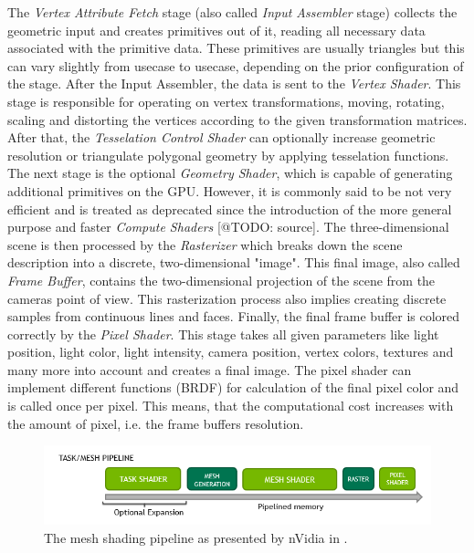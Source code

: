 \noindent
The \emph{Vertex Attribute Fetch} stage (also called \emph{Input Assembler} stage) collects the geometric 
input and creates primitives out of it, reading all necessary data associated with the primitive data. 
These primitives are usually triangles but this can vary slightly from usecase to usecase, depending
on the prior configuration of the stage. After the Input Assembler, the data is sent to the \emph{Vertex Shader}.
This stage is responsible for operating on vertex transformations, moving, rotating, scaling and distorting the 
vertices according to the given transformation matrices. After that, the \emph{Tesselation Control Shader} can 
optionally increase geometric resolution or triangulate polygonal geometry by applying tesselation functions.
The next stage is the optional \emph{Geometry Shader}, which is capable of generating additional primitives 
on the GPU. However, it is commonly said to be not very efficient and is treated as deprecated since the introduction 
of the more general purpose and faster \emph{Compute Shaders} [@TODO: source]. 
The three-dimensional scene is then processed by the \emph{Rasterizer} which breaks down the scene description into 
a discrete, two-dimensional "image". This final image, also called \emph{Frame Buffer}, contains the two-dimensional 
projection of the scene from the cameras point of view. This rasterization process also implies creating discrete 
samples from continuous lines and faces.
Finally, the final frame buffer is colored correctly by the \emph{Pixel Shader}. This stage takes all given parameters 
like light position, light color, light intensity, camera position, vertex colors, textures and many more into account 
and creates a final image. The pixel shader can implement different functions (\ac{BRDF}) for calculation of the final 
pixel color and is called once per pixel. This means, that the computational cost increases with the amount of pixel, 
i.e. the frame buffers resolution. 


\begin{figure}[h]
    \centering
    \includegraphics[width=\linewidth]{images/graphics/mesh-rendering-pipeline.png}
    \caption{The mesh shading pipeline as presented by nVidia in \cite[Christoph Kubisch]{Kubisch2018}.}
    \label{fig:mesh-rendering-pipeline}
\end{figure}

